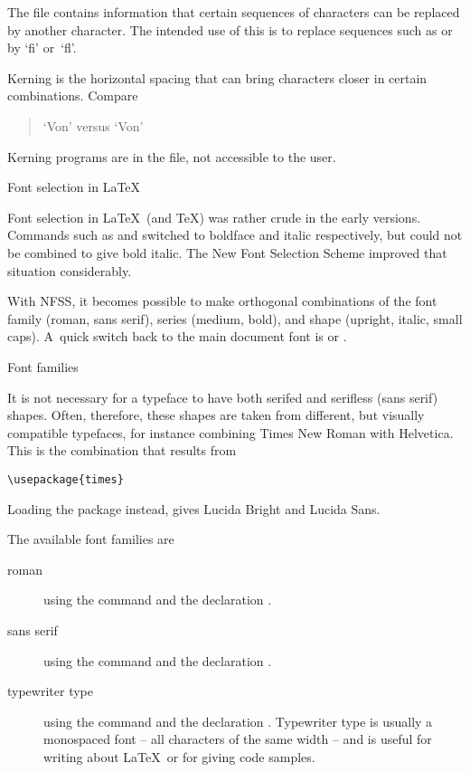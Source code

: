 The  file contains information that certain sequences of
characters can be replaced by another character. The intended use of
this is to replace sequences such as  or  by `fi' or~`fl'.

Kerning is the horizontal spacing that can bring characters closer in
certain combinations. Compare
\begin{quote}`Von' versus `\hbox{V}\hbox{on}'
\end{quote}
Kerning programs are in the  file, not accessible to the user.

 {Font selection in \LaTeX}

Font selection in \LaTeX\ (and \TeX) was
rather crude in the early versions. Commands such as  and
 switched to boldface and italic respectively, but could not be
combined to give bold italic. The New Font Selection
Scheme improved that situation considerably.

With NFSS, it becomes possible to make orthogonal combinations of the
font family (roman, sans serif), series (medium, bold), and shape
(upright, italic, small caps).
A~quick switch back to the main document font is 
or .

 {Font families}

It is not necessary for a typeface to have both serifed and serifless (sans
serif) shapes. Often, therefore, these shapes are taken from different, but
visually compatible typefaces, for instance combining Times New Roman
with Helvetica. This is the combination that results from
\begin{verbatim}
\usepackage{times}
\end{verbatim}
Loading the package  instead, gives Lucida Bright and
Lucida Sans.

The available font families are
\begin{description}
\item[roman] using the command  and the declaration
  .
\item[sans serif]  using the command  and the declaration
  .
\item[typewriter type] using the command  and the
  declaration . Typewriter type is usually a
  monospaced font -- all characters of the same width -- and is useful
  for writing about \LaTeX\ or for giving code samples.
\end{description}


